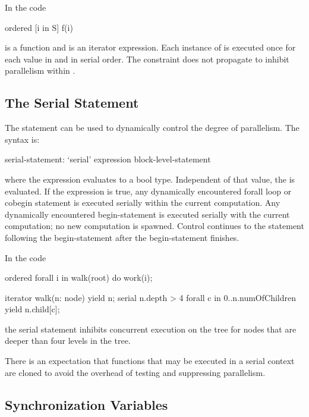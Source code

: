 \begin{example}
In the code
\begin{chapel}
ordered [i in S] f(i) 
\end{chapel}
 is a function and  is an iterator expression. Each
instance of  is executed once for each value in 
and in serial order. The  constraint does not propagate
to inhibit parallelism within .
\end{example}

\subsection{The Serial Statement}
\label{Serial}

The  statement can be used to dynamically control the
degree of parallelism.  The syntax is:
\begin{syntax}
serial-statement:
  `serial' expression block-level-statement
\end{syntax}
where the expression evaluates to a bool type.  Independent of that
value, the  is evaluated. If the
expression is true, any dynamically encountered forall loop or cobegin
statement is executed serially within the current computation.  Any
dynamically encountered begin-statement is executed serially with the
current computation; no new computation is spawned.  Control continues
to the statement following the begin-statement after the
begin-statement finishes.

\begin{example}
In the code
\begin{chapel}
ordered forall i in walk(root) do
  work(i);

iterator walk(n: node) {
  yield n;
  serial n.depth > 4 forall c in 0..n.numOfChildren {
      yield n.child[c];
  }
}
\end{chapel}
the serial statement inhibits concurrent execution on the tree for
nodes that are deeper than four levels in the tree.
\end{example}

There is an expectation that functions that may be executed in a
serial context are cloned to avoid the overhead of testing and
suppressing parallelism.

\subsection{Synchronization Variables}
\label{Synchronization_Variables}


